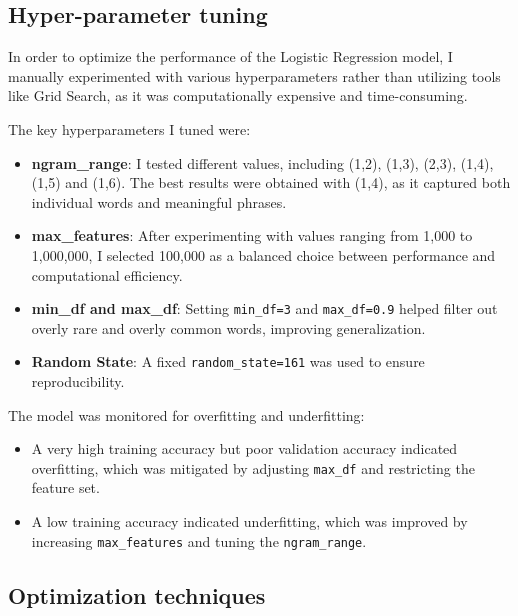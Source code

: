\documentclass[12pt]{fphw}
\begin{document}
\subsection{Hyper-parameter tuning}

In order to optimize the performance of the Logistic Regression model, I manually experimented with various hyperparameters rather than utilizing tools like Grid Search, as it was computationally expensive and time-consuming.

The key hyperparameters I tuned were:
\begin{itemize}
    \item \textbf{ngram\_range}: I tested different values, including (1,2), (1,3), (2,3), (1,4), (1,5) and (1,6). The best results were obtained with (1,4), as it captured both individual words and meaningful phrases.
    \item \textbf{max\_features}: After experimenting with values ranging from 1,000 to 1,000,000, I selected 100,000 as a balanced choice between performance and computational efficiency.
    \item \textbf{min\_df and max\_df}: Setting \texttt{min\_df=3} and \texttt{max\_df=0.9} helped filter out overly rare and overly common words, improving generalization.
    \item \textbf{Random State}: A fixed \texttt{random\_state=161} was used to ensure reproducibility.
\end{itemize}

The model was monitored for overfitting and underfitting:
\begin{itemize}
    \item A very high training accuracy but poor validation accuracy indicated overfitting, which was mitigated by adjusting \texttt{max\_df} and restricting the feature set.
    \item A low training accuracy indicated underfitting, which was improved by increasing \texttt{max\_features} and tuning the \texttt{ngram\_range}.
\end{itemize}

\subsection{Optimization techniques}
\end{document}
